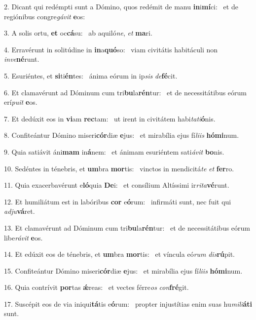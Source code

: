 2. Dicant qui redémpti sunt a Dómino, quos redémit de manu \textbf{in}i\textbf{mí}ci: \ast\  et de regiónibus congre\textit{gá}\textit{vit} \textbf{e}os:\

3. A solis ortu, \textbf{et} oc\textbf{cá}su: \ast\  ab aquiló\textit{ne}, \textit{et} \textbf{ma}ri.\

4. Erravérunt in solitúdine in \textbf{in}a\textbf{quó}so: \ast\  viam civitátis habitáculi non \textit{in}\textit{ve}\textbf{né}runt.\

5. Esuriéntes, et \textbf{si}ti\textbf{én}tes: \ast\  ánima eórum in ip\textit{sis} \textit{de}\textbf{fé}cit.\

6. Et clamavérunt ad Dóminum cum tri\textbf{bu}la\textbf{rén}tur: \ast\  et de necessitátibus eórum erí\textit{pu}\textit{it} \textbf{e}os.\

7. Et dedúxit eos in \textbf{vi}am \textbf{rec}tam: \ast\  ut irent in civitátem habi\textit{ta}\textit{ti}\textbf{ó}nis.\

8. Confiteántur Dómino miseri\textbf{cór}diæ \textbf{e}jus: \ast\  et mirabília ejus fí\textit{li}\textit{is} \textbf{hó}\textbf{mi}num.\

9. Quia satiávit áni\textbf{mam} in\textbf{á}nem: \ast\  et ánimam esuriéntem sati\textit{á}\textit{vit} \textbf{bo}nis.\

10. Sedéntes in ténebris, et \textbf{um}bra \textbf{mor}tis: \ast\  vinctos in mendicitá\textit{te} \textit{et} \textbf{fer}ro.\

11. Quia exacerbavérunt e\textbf{ló}quia \textbf{De}i: \ast\  et consílium Altíssimi ir\textit{ri}\textit{ta}\textbf{vé}runt.\

12. Et humiliátum est in labóribus \textbf{cor} e\textbf{ó}rum: \ast\  infirmáti sunt, nec fuit qui \textit{ad}\textit{ju}\textbf{vá}ret.\

13. Et clamavérunt ad Dóminum cum tri\textbf{bu}la\textbf{rén}tur: \ast\  et de necessitátibus eórum libe\textit{rá}\textit{vit} \textbf{e}os.\

14. Et edúxit eos de ténebris, et \textbf{um}bra \textbf{mor}tis: \ast\  et víncula eó\textit{rum} \textit{dis}\textbf{rú}pit.\

15. Confiteántur Dómino miseri\textbf{cór}diæ \textbf{e}jus: \ast\  et mirabília ejus fí\textit{li}\textit{is} \textbf{hó}\textbf{mi}num.\

16. Quia contrívit \textbf{por}tas \textbf{ǽ}reas: \ast\  et vectes férre\textit{os} \textit{con}\textbf{fré}git.\

17. Suscépit eos de via iniqui\textbf{tá}tis e\textbf{ó}rum: \ast\  propter injustítias enim suas hu\textit{mi}\textit{li}\textbf{á}\textbf{ti} sunt.\

